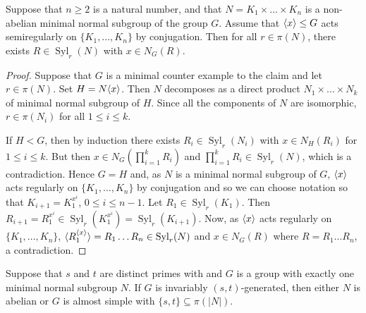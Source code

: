 \documentclass[12pt,a4paper]{amsart}
\DeclareMathOperator{\Syl}{Syl}
\DeclareMathOperator{\syl}{Syl}
\DeclarePairedDelimiter{\gen}{\langle}{\rangle}
\begin{document}
\begin{lemma}\label{lem:normalizes sylow}
Suppose that $n \ge 2$ is a natural number, and that $N= K_1\times\dots \times K_n$ is a non-abelian minimal normal subgroup of the group $G$. Assume that $\gen{x}\le G$ acts semiregularly on $\{K_1,\dots, K_n\}$ by conjugation. Then for all $r \in \pi(N)$, there exists $R \in \Syl_r(N)$ with $x \in N_G(R)$.
\end{lemma}

\begin{proof} Suppose that $G$ is a minimal counter example to the claim and let $r \in \pi(N)$.
Set  $H= N\gen{x}$. Then $N$ decomposes as a direct product $N_1\times \dots \times N_k$ of minimal normal subgroup of $H$.   Since all the components of $N$ are isomorphic, $r \in \pi(N_i)$ for all $1\le i \le k$.

If $H<G$, then by induction there exists $R_i\in \Syl_r(N_i)$ with $x \in N_H(R_i)$ for $1\le i \le k$. But then $x \in N_G(\prod_{i=1}^kR_i )$ and $\prod_{i=1}^kR_i \in \Syl_r(N)$, which is a contradiction.  Hence $G=H$ and, as $N$ is a minimal normal subgroup of $G$,  $\gen{x}$ acts regularly  on $\{K_1,\dots, K_n\}$ by conjugation and so we can choose notation so that $K_{i+1}=K_1^{x^i}$, $0\le i\le n-1$.
Let $R_1\in \Syl_r(K_1)$. Then $R_{i+1}= R_1^{x^i}\in \syl_r(K_1^{x^i})=\Syl_r(K_{i+1})$. Now, as $\gen{x}$ acts regularly on $\{K_1,\dots, K_n\}$,  $\gen{R_1^{\gen{x}}}= R_1  \dots  R_n\in \Syl_r(N)$ and   $x \in N_G(R)$ where $R=R_1  \dots  R_n$, a contradiction.
\end{proof}



\begin{lemma}\label{lem:structure}
Suppose that $s$ and $t $ are distinct primes with and $G$ is a   group with exactly one minimal normal subgroup $N$. If $G$ is   invariably $(s,t)$-generated, then either $N$ is abelian or $G$ is almost simple with $\{s,t\}\subseteq \pi(|N|)$.
\end{lemma}
\end{document}
